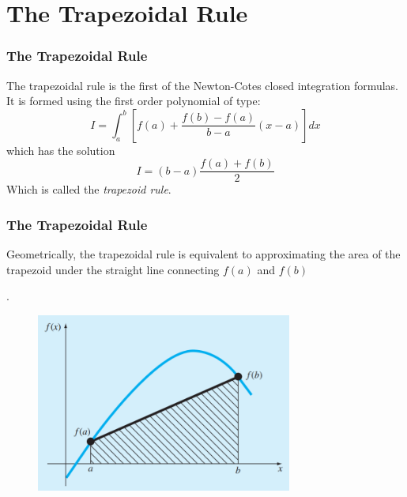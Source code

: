 \documentclass{if-beamer}
\begin{document}
\section{The Trapezoidal Rule}
\begin{frame}
	\frametitle{The Trapezoidal Rule}
	The trapezoidal rule is the first of the Newton-Cotes closed integration formulas. It is formed using the first order polynomial of type:
	$$I = \int_{a}^{b}\left[f(a)+\frac{f(b)-f(a)}{b-a}(x-a)\right]dx$$
	which has the solution
	$$I = (b-a)\frac{f(a)+f(b)}{2}$$
	Which is called the \textit{trapezoid rule}.
\end{frame}

\begin{frame}
	\frametitle{The Trapezoidal Rule}
	Geometrically, the trapezoidal rule is equivalent to approximating the area of the trapezoid under the straight line connecting $f(a)$ and $f(b)$\\\vspace{10pt}
	\begin{minipage}{0.5\textwidth}
		.
	\end{minipage}
	\begin{minipage}{0.5\textwidth}
		\begin{figure}
			\centering
			\includegraphics[width=0.75\textwidth]{figures/traprule}
		\end{figure}
	\end{minipage}
\end{frame}
\end{document}
